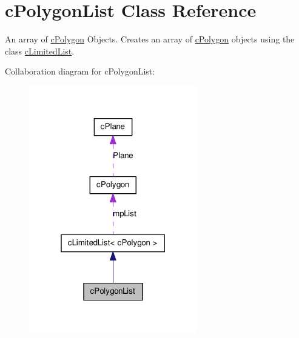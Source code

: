 \hypertarget{classc_polygon_list}{
\section{cPolygonList Class Reference}
\label{classc_polygon_list}
}


An array of \hyperlink{classc_polygon}{cPolygon} Objects. Creates an array of \hyperlink{classc_polygon}{cPolygon} objects using the class \hyperlink{classc_limited_list}{cLimitedList}.  




Collaboration diagram for cPolygonList:\nopagebreak
\begin{figure}[H]
\begin{center}
\leavevmode
\includegraphics[width=208pt]{classc_polygon_list__coll__graph}
\end{center}
\end{figure}
